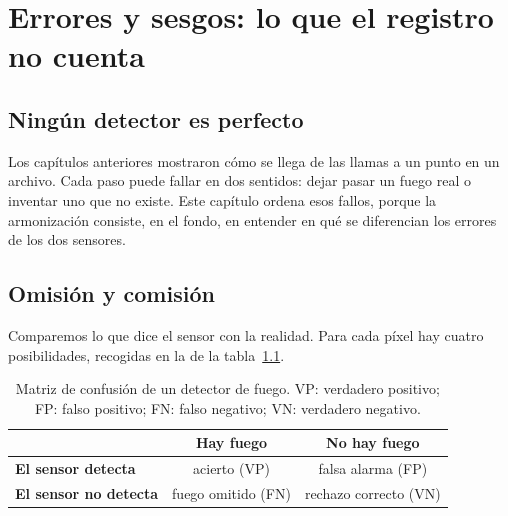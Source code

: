 \chapter{Errores y sesgos: lo que el registro no cuenta}\label{cap:errores}


\section{Ningún detector es perfecto}

Los capítulos anteriores mostraron cómo se llega de las llamas a un punto en un archivo. Cada
paso puede fallar en dos sentidos: dejar pasar un fuego real o inventar uno que no existe. Este
capítulo ordena esos fallos, porque la armonización consiste, en el fondo, en entender en qué se
diferencian los errores de los dos sensores.

\section{Omisión y comisión}

Comparemos lo que dice el sensor con la realidad. Para cada píxel hay cuatro posibilidades,
recogidas en la  de la tabla~\ref{tab:confusion}.

\begin{table}[ht]
\centering
\renewcommand{\arraystretch}{1.4}
\begin{tabular}{l|cc}
 & \textbf{Hay fuego} & \textbf{No hay fuego} \\
\hline
\textbf{El sensor detecta} & acierto (VP) & \cellcolor{fuegoClaro}falsa alarma (FP) \\
\textbf{El sensor no detecta} & \cellcolor{brasaClaro}fuego omitido (FN) & rechazo correcto (VN) \\
\end{tabular}
\caption{Matriz de confusión de un detector de fuego. VP: verdadero positivo; FP: falso
positivo; FN: falso negativo; VN: verdadero negativo.}
\label{tab:confusion}
\end{table}

